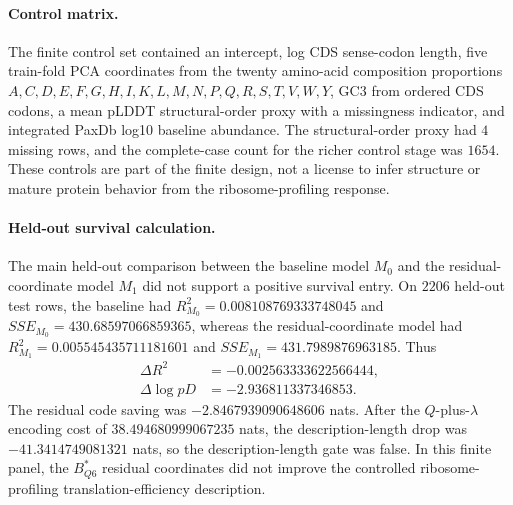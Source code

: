\paragraph{Control matrix.}
The finite control set contained an intercept, log CDS sense-codon length, five train-fold PCA coordinates from the twenty amino-acid composition proportions $A,C,D,E,F,G,H,I,K,L,M,N,P,Q,R,S,T,V,W,Y$, GC3 from ordered CDS codons, a mean pLDDT structural-order proxy with a missingness indicator, and integrated PaxDb log10 baseline abundance.  The structural-order proxy had $4$ missing rows, and the complete-case count for the richer control stage was $1654$.  These controls are part of the finite design, not a license to infer structure or mature protein behavior from the ribosome-profiling response.

\paragraph{Held-out survival calculation.}
The main held-out comparison between the baseline model $M_0$ and the residual-coordinate model $M_1$ did not support a positive survival entry.  On $2206$ held-out test rows, the baseline had $R^2_{M_0}=0.008108769333748045$ and $SSE_{M_0}=430.68597066859365$, whereas the residual-coordinate model had $R^2_{M_1}=0.005545435711181601$ and $SSE_{M_1}=431.7989876963185$.  Thus
$$
\begin{aligned}
\Delta R^2 &= -0.002563333622566444,\\
\Delta \log pD &= -2.936811337346853.
\end{aligned}
$$
The residual code saving was $-2.8467939090648606$ nats.  After the $Q$-plus-$\lambda$ encoding cost of $38.494680999067235$ nats, the description-length drop was $-41.3414749081321$ nats, so the description-length gate was false.  In this finite panel, the $B^{*}_{Q6}$ residual coordinates did not improve the controlled ribosome-profiling translation-efficiency description.

